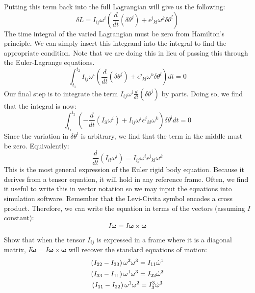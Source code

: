 Putting this term back into the full \gls{Lagrangian} will give us the following:
$$\delta L = I_{ij}\omega^i\left(\frac{d}{dt}(\delta\theta^j)+{\epsilon^j}_{kl}\omega^k\delta\theta^l\right)$$
The time integral of the varied \gls{Lagrangian} must be zero from Hamilton's principle. We can simply insert this integrand into the integral to find the appropriate condition. Note that we are doing this in lieu of passing this through the Euler-Lagrange equations.
$$\int_{t_1}^{t_2}I_{ij}\omega^i\left(\frac{d}{dt}(\delta\theta^j)+{\epsilon^j}_{kl}\omega^k\delta\theta^l\right)dt=0$$
Our final step is to integrate the term $I_{ij}\omega^i\frac{d}{dt}(\delta\theta^j)$ by parts. Doing so, we find that the integral is now:
$$\int_{t_1}^{t_2}\left(-\frac{d}{dt}(I_{il}\omega^i)+I_{ij}\omega^i{\epsilon^j}_{kl}\omega^k\right)\delta\theta^ldt=0$$
Since the variation in $\delta\theta^l$ is arbitrary, we find that the term in the middle must be zero. Equivalently:
$$\frac{d}{dt}(I_{il}\omega^i)=I_{ij}\omega^i{\epsilon^j}_{kl}\omega^k$$
This is the most general expression of the Euler rigid body equation. Because it derives from a tensor equation, it will hold in any reference frame. Often, we find it useful to write this in vector notation so we may input the equations into simulation software. Remember that the Levi-Civita symbol encodes a cross product. Therefore, we can write the equation in terms of the vectors (assuming $I$ constant):
$$I\bm{\dot{\omega}}=I\bm{\omega}\times\bm{\omega}$$
\begin{exercise}
Show that when the tensor $I_{ij}$ is expressed in a frame where it is a diagonal matrix, $I\bm{\dot{\omega}}=I\bm{\omega}\times\bm{\omega}$ will recover the standard equations of motion:
\begin{gather}
\left(I_{22}-I_{33}\right)\omega^2\omega^3=I_{11}\dot{\omega}^1\\
     \color{black}\left(I_{33}-I_{11}\right)\omega^1\omega^3=I_{22}\dot{\omega}^2\\
     \color{black}\left(I_{11}-I_{22}\right)\omega^1\omega^2=I^3_3\dot{\omega}^3
\end{gather}
\end{exercise}

